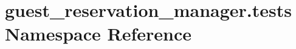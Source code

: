 \hypertarget{namespaceguest__reservation__manager_1_1tests}{\section{guest\-\_\-reservation\-\_\-manager.\-tests Namespace Reference}
\label{namespaceguest__reservation__manager_1_1tests}
}
